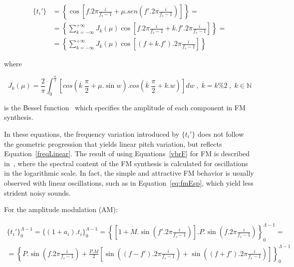 \begin{equation}\label{eq:fmEsp}
\begin{split}
\{t_i'\} & = \left \{ \cos \left [f . 2 \pi \frac{i}{f_s-1} + \mu . sen \left ( f' . 2 \pi \frac{i}{ f_s -1 } \right ) \right ] \right \} = \\
 & = \left \{ \sum_{k=-\infty}^{+\infty} J_k(\mu) \cos \left [ f . 2 \pi \frac{i}{f_s-1} + k . f' . 2 \pi \frac{i}{f_s-1} \right ]  \right \} = \\
 & = \left \{ \sum_{k=-\infty}^{+\infty} J_k(\mu) \cos \left [ (f+k.f') . 2 \pi \frac{i}{f_s-1} \right ]  \right \}
\end{split}
\end{equation}

\noindent where

\begin{equation}\label{eq:Bessel}
J_k(\mu) = \frac{2}{\pi} \int_0^{\frac{\pi}{2}}\left [ cos \left (\overline{k}\;\frac{\pi}{2} + \mu . \sin w \right ) . cos \left ( \overline{k}\;\frac{\pi}{2} + k . w \right ) \right ] dw \;,\; \overline{k} = k \% 2 \;,\; k \in \mathbb{N}
\end{equation}

\noindent is the Bessel function~\cite{BesselCCRMA,JOSFM} which specifies the amplitude of each component in FM synthesis.

In these equations, the frequency variation introduced by $\{t_i'\}$ does not follow the geometric progression that yields linear pitch variation, but reflects Equation~\ref{freqLinear}. The result of using Equations~\ref{vbrF} for FM is described in~\cite{dissertacao}, where the spectral content of the FM synthesis is calculated for oscillations in the logarithmic scale. In fact, the simple and attractive FM behavior is usually observed with linear oscillations, such as in Equation~\ref{eq:fmEsp}, which yield less strident noisy sounds.

For the amplitude modulation (AM):

\begin{equation}\label{eq:specAM}
\begin{split}
\{t_i'\}_0^{\Lambda-1} =\{(1+a_i) . t_i\}_0^{\Lambda-1} = \left \{ \left [ 1+M.\sin \left ( f'.2\pi\frac{i}{f_s -1} \right ) \right] .P .\sin \left ( f.2\pi\frac{i}{f_s -1} \right ) \right \}_0^{\Lambda-1} = \\ 
                        =  \left\{P.\sin \left( f.2\pi\frac{i}{f_s -1}  \right ) +  \frac{P.M}{2} \left [ \sin \left( (f-f').2\pi\frac{i}{f_s -1}  \right )  + \sin \left( (f+f').2\pi\frac{i}{f_s -1}  \right ) \right ] \right \}_0^{\Lambda-1}
\end{split}
\end{equation}

